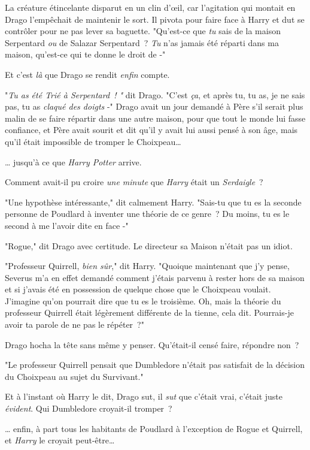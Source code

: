 La créature étincelante disparut en un clin d'œil, car l'agitation qui montait en Drago l'empêchait de maintenir le sort. Il pivota pour faire face à Harry et dut se contrôler pour ne pas lever sa baguette. "Qu'est-ce que \emph{tu} sais de la maison Serpentard \emph{ou} de Salazar Serpentard~? \emph{Tu} n'as jamais été réparti dans ma maison, qu'est-ce qui te donne le droit de -"

Et c'est \emph{là} que Drago se rendit \emph{enfin} compte.

"\emph{Tu as été Trié à Serpentard~! "} dit Drago. "C'est \emph{ça}, et après tu, tu as, je ne sais pas, tu as \emph{claqué des doigts} -" Drago avait un jour demandé à Père s'il serait plus malin de se faire répartir dans une autre maison, pour que tout le monde lui fasse confiance, et Père avait sourit et dit qu'il y avait lui aussi pensé à son âge, mais qu'il était impossible de tromper le Choixpeau…

… jusqu'à ce que \emph{Harry Potter} arrive.

Comment avait-il pu croire \emph{une minute} que \emph{Harry} était un \emph{Serdaigle}~?

"Une hypothèse intéressante," dit calmement Harry. "Sais-tu que tu es la seconde personne de Poudlard à inventer une théorie de ce genre~? Du moins, tu es le second à me l'avoir dite en face -"

"Rogue," dit Drago avec certitude. Le directeur sa Maison n'était pas un idiot.

"Professeur Quirrell, \emph{bien sûr}," dit Harry. "Quoique maintenant que j'y pense, Severus m'a en effet demandé comment j'étais parvenu à rester hors de sa maison et si j'avais été en possession de quelque chose que le Choixpeau voulait. J'imagine qu'on pourrait dire que tu es le troisième. Oh, mais la théorie du professeur Quirrell était légèrement différente de la tienne, cela dit. Pourrais-je avoir ta parole de ne pas le répéter~?"

Drago hocha la tête sans même y penser. Qu'était-il censé faire, répondre non~?

"Le professeur Quirrell pensait que Dumbledore n'était pas satisfait de la décision du Choixpeau au sujet du Survivant."

Et à l'instant où Harry le dit, Drago sut, il \emph{sut} que c'était vrai, c'était juste \emph{évident}. Qui Dumbledore croyait-il tromper~?

… enfin, à part tous les habitants de Poudlard à l'exception de Rogue et Quirrell, et \emph{Harry} le croyait peut-être…

